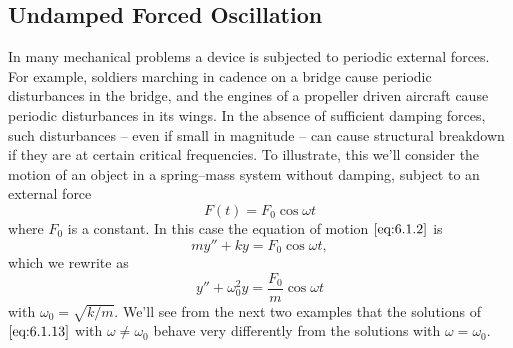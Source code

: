 \documentclass{ximera}
\begin{document}
 
\subsection*{Undamped Forced Oscillation}
 
In many mechanical problems a device is subjected to periodic external
forces. For example, soldiers marching in cadence on a bridge cause
periodic disturbances in the bridge, and the engines of a propeller
driven aircraft cause periodic disturbances in its wings. In the
absence of sufficient damping forces, such disturbances -- even if
small in magnitude -- can cause structural breakdown if they are at
certain critical frequencies. To illustrate, this we'll consider the
motion of an object in a spring--mass system without damping, subject
to an external force
$$
F(t)=F_0\cos\omega t
$$
where $F_0$ is a constant. In this case the equation of motion
$\eqref{eq:6.1.2}$ is
$$
my''+ky=F_0\cos\omega t,
$$
which we rewrite as
\begin{equation}\label{eq:6.1.13}
y''+\omega_0^2y=\frac{F_0}{m}\cos\omega t
\end{equation}
with $\omega_0=\sqrt{k/m}$.
We'll see from the next two examples that the solutions of
$\eqref{eq:6.1.13}$
with $\omega\ne\omega_0$ behave very differently from the solutions with
$\omega=\omega_0$.
\end{document}
